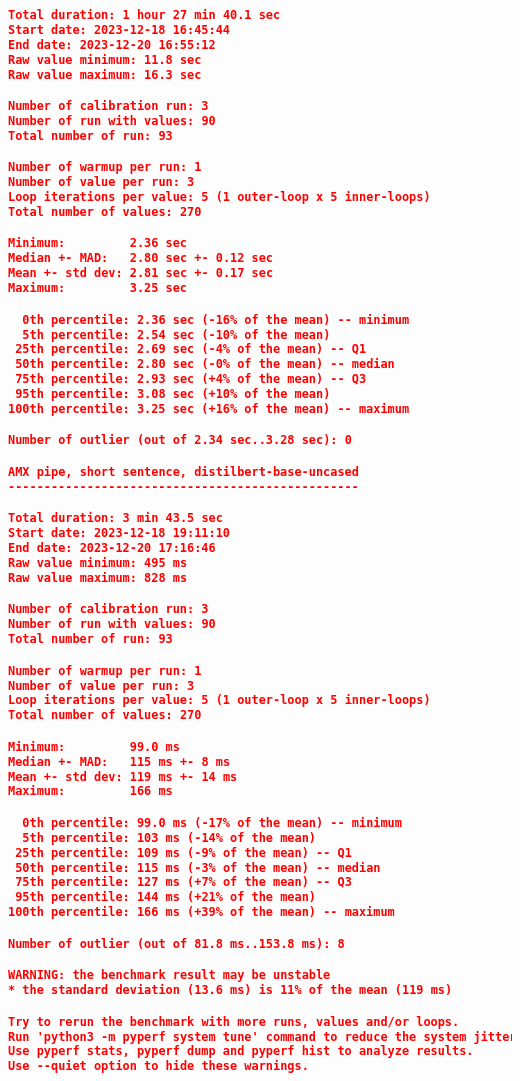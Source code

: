 \begin{lstlisting}[language=json]
Total duration: 1 hour 27 min 40.1 sec
Start date: 2023-12-18 16:45:44
End date: 2023-12-20 16:55:12
Raw value minimum: 11.8 sec
Raw value maximum: 16.3 sec

Number of calibration run: 3
Number of run with values: 90
Total number of run: 93

Number of warmup per run: 1
Number of value per run: 3
Loop iterations per value: 5 (1 outer-loop x 5 inner-loops)
Total number of values: 270

Minimum:         2.36 sec
Median +- MAD:   2.80 sec +- 0.12 sec
Mean +- std dev: 2.81 sec +- 0.17 sec
Maximum:         3.25 sec

  0th percentile: 2.36 sec (-16% of the mean) -- minimum
  5th percentile: 2.54 sec (-10% of the mean)
 25th percentile: 2.69 sec (-4% of the mean) -- Q1
 50th percentile: 2.80 sec (-0% of the mean) -- median
 75th percentile: 2.93 sec (+4% of the mean) -- Q3
 95th percentile: 3.08 sec (+10% of the mean)
100th percentile: 3.25 sec (+16% of the mean) -- maximum

Number of outlier (out of 2.34 sec..3.28 sec): 0

AMX pipe, short sentence, distilbert-base-uncased
-------------------------------------------------

Total duration: 3 min 43.5 sec
Start date: 2023-12-18 19:11:10
End date: 2023-12-20 17:16:46
Raw value minimum: 495 ms
Raw value maximum: 828 ms

Number of calibration run: 3
Number of run with values: 90
Total number of run: 93

Number of warmup per run: 1
Number of value per run: 3
Loop iterations per value: 5 (1 outer-loop x 5 inner-loops)
Total number of values: 270

Minimum:         99.0 ms
Median +- MAD:   115 ms +- 8 ms
Mean +- std dev: 119 ms +- 14 ms
Maximum:         166 ms

  0th percentile: 99.0 ms (-17% of the mean) -- minimum
  5th percentile: 103 ms (-14% of the mean)
 25th percentile: 109 ms (-9% of the mean) -- Q1
 50th percentile: 115 ms (-3% of the mean) -- median
 75th percentile: 127 ms (+7% of the mean) -- Q3
 95th percentile: 144 ms (+21% of the mean)
100th percentile: 166 ms (+39% of the mean) -- maximum

Number of outlier (out of 81.8 ms..153.8 ms): 8

WARNING: the benchmark result may be unstable
* the standard deviation (13.6 ms) is 11% of the mean (119 ms)

Try to rerun the benchmark with more runs, values and/or loops.
Run 'python3 -m pyperf system tune' command to reduce the system jitter.
Use pyperf stats, pyperf dump and pyperf hist to analyze results.
Use --quiet option to hide these warnings.


\end{lstlisting}
